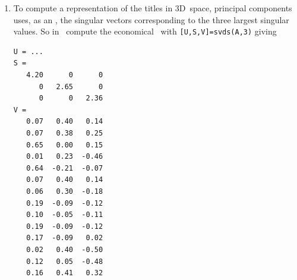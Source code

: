 \begin{enumerate}
\item To compute a representation of the titles in 3D~space, principal components uses, as an , the singular vectors corresponding to the three largest singular values.
So in \script\ compute the economical \svd\ with \verb|[U,S,V]=svds(A,3)| giving \twodp
\begin{verbatim}
U = ...
S =
   4.20      0      0
      0   2.65      0
      0      0   2.36
V =
   0.07   0.40   0.14
   0.07   0.38   0.25
   0.65   0.00   0.15
   0.01   0.23  -0.46
   0.64  -0.21  -0.07
   0.07   0.40   0.14
   0.06   0.30  -0.18
   0.19  -0.09  -0.12
   0.10  -0.05  -0.11
   0.19  -0.09  -0.12
   0.17  -0.09   0.02
   0.02   0.40  -0.50
   0.12   0.05  -0.48
   0.16   0.41   0.32
\end{verbatim}


\end{enumerate}
